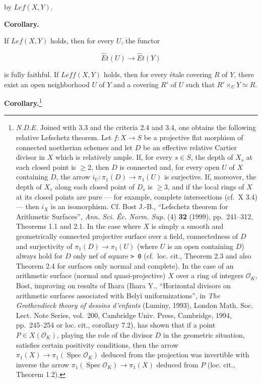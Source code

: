 \documentclass[
]{article}
\begin{document}
by \(Lef(X, Y)\).

\textbf{Corollary.}

If \(Lef(X, Y)\) holds, then for every \(U\), the functor

\[
\hat{E}t(U) \longrightarrow \hat{E}t(Y)
\]

is fully faithful. If \(Leff(X, Y)\) holds, then for every étale
covering \(R\) of \(Y\), there exist an open neighborhood \(U\) of \(Y\)
and a covering \(R'\) of \(U\) such that \(R' \times_{U} Y \simeq R\).

\textbf{Corollary.}\footnote{\emph{N.D.E.} Joined with 3.3 and the
  criteria 2.4 and 3.4, one obtains the following relative Lefschetz
  theorem. Let \(f: X \to S\) be a projective flat morphism of connected
  noetherian schemes and let \(D\) be an effective relative Cartier
  divisor in \(X\) which is relatively ample. If, for every \(s \in S\),
  the depth of \(X_{s}\) at each closed point is \(\geqslant 2\), then
  \(D\) is connected and, for every open \(U\) of \(X\) containing
  \(D\), the arrow \(i_{U}: \pi_{1}(D) \to \pi_{1}(U)\) is surjective.
  If, moreover, the depth of \(X_{s}\) along each closed point of
  \(D_{s}\) is \(\geqslant 3\), and if the local rings of \(X\) at its
  closed points are pure --- for example, complete intersections (cf.~X
  3.4) --- then \(i_{X}\) is an isomorphism. Cf. Bost J.-B., ``Lefschetz
  theorem for Arithmetic Surfaces'', \emph{Ann. Sci. Éc. Norm. Sup.} (4)
  \textbf{32} (1999), pp.~241--312, Theorems 1.1 and 2.1. In the case
  where \(X\) is simply a smooth and geometrically connected projective
  surface over a field, connectedness of \(D\) and surjectivity of
  \(\pi_{1}(D) \to \pi_{1}(U)\) (where \(U\) is an open containing
  \(D\)) always hold for \(D\) only nef of square
  \texttt{\textgreater{}\ 0} (cf.~loc. cit., Theorem 2.3 and also
  Theorem 2.4 for surfaces only normal and complete). In the case of an
  arithmetic surface (normal and quasi-projective) \(X\) over a ring of
  integers \(\mathcal{O}_{K}\), Bost, improving on results of Ihara
  (Ihara Y., ``Horizontal divisors on arithmetic surfaces associated
  with Belyĭ uniformizations'', in \emph{The Grothendieck theory of
  dessins d'enfants} (Luminy, 1993), London Math. Soc. Lect. Note
  Series, vol.~200, Cambridge Univ. Press, Cambridge, 1994, pp.~245--254
  or loc. cit., corollary 7.2), has shown that if a point
  \(P \in X(\mathcal{O}_{K})\), playing the role of the divisor \(D\) in
  the geometric situation, satisfies certain positivity conditions, then
  the arrow
  \(\pi_{1}(X) \to \pi_{1}(\operatorname{Spec} \mathcal{O}_{K})\)
  deduced from the projection was invertible with inverse the arrow
  \(\pi_{1}(\operatorname{Spec} \mathcal{O}_{K}) \to \pi_{1}(X)\)
  deduced from \(P\) (loc. cit., Theorem 1.2).}
\end{document}
